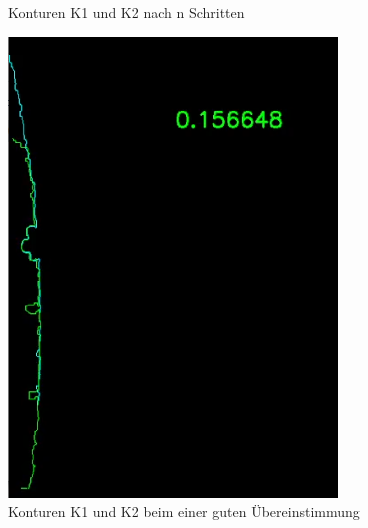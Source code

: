 \documentclass[../main.tex]{subfiles}
\begin{document}
\begin{figure}[h]
\begin{minipage}{0.24\textwidth}
        \caption{Konturen K1 und K2 nach n Schritten}
        \label{fig:stitching_middle}
    \end{minipage}\hfill
    \begin{minipage}{0.24\textwidth}
        \centering
        \includegraphics[width=\textwidth]{images/stitching_match.PNG} %
        \caption{Konturen K1 und K2 beim einer guten Übereinstimmung}
        \label{fig:stitching_match}
    \end{minipage}\hfill
    \begin{minipage}{0.24\textwidth}
        \centering

\end{minipage}
\end{figure}
\end{document}

